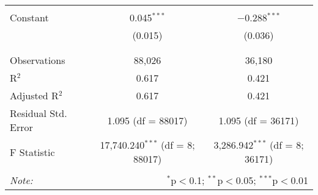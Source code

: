 \begin{table}[!htbp]
\begin{tabular}{@{\extracolsep{5pt}}lcc}
  & & \\ 
 Constant & 0.045$^{***}$ & $-$0.288$^{***}$ \\ 
  & (0.015) & (0.036) \\ 
  & & \\ 
\hline \\[-1.8ex] 
Observations & 88,026 & 36,180 \\ 
R$^{2}$ & 0.617 & 0.421 \\ 
Adjusted R$^{2}$ & 0.617 & 0.421 \\ 
Residual Std. Error & 1.095 (df = 88017) & 1.095 (df = 36171) \\ 
F Statistic & 17,740.240$^{***}$ (df = 8; 88017) & 3,286.942$^{***}$ (df = 8; 36171) \\ 
\hline 
\hline \\[-1.8ex] 
\textit{Note:}  & \multicolumn{2}{r}{$^{*}$p$<$0.1; $^{**}$p$<$0.05; $^{***}$p$<$0.01} \\ 
\end{tabular} 
\end{table} 

